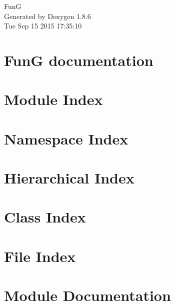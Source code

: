 \documentclass[twoside]{book}
\newcommand{\clearemptydoublepage}{%
  \newpage{\pagestyle{empty}\cleardoublepage}%
}
\begin{document}
\hypersetup{pageanchor=false}
\begin{titlepage}
\vspace*{7cm}
\begin{center}%
{\Large Fun\-G }\\
\vspace*{1cm}
{\large Generated by Doxygen 1.8.6}\\
\vspace*{0.5cm}
{\small Tue Sep 15 2015 17:35:10}\\
\end{center}
\end{titlepage}
\clearemptydoublepage
\tableofcontents
\clearemptydoublepage
{}
\hypersetup{pageanchor=true}

\chapter{Fun\-G documentation}
\label{index}\hypertarget{index}{}
\chapter{Module Index}

\chapter{Namespace Index}

\chapter{Hierarchical Index}

\chapter{Class Index}

\chapter{File Index}

\chapter{Module Documentation}













\end{document}
